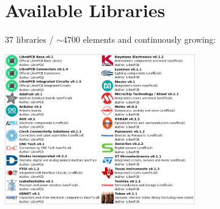 \section{Available Libraries}

\begin{frame}{\secname}

  37 libraries / $\sim$4700 elements and continuously growing:

  \begin{center}
    \includegraphics[height=6.5cm]{images/available_libraries.png}
  \end{center}

\end{frame}
